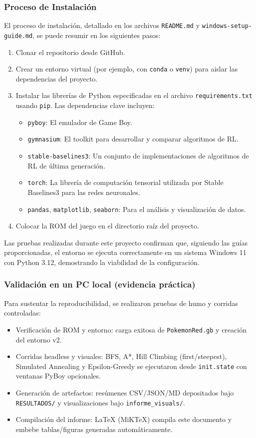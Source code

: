\documentclass[12pt, oneside, openany]{book}
\begin{document}
\subsubsection{Proceso de Instalación}
El proceso de instalación, detallado en los archivos \texttt{README.md} y \texttt{windows-setup-guide.md}, se puede resumir en los siguientes pasos:
\begin{enumerate}
    \item Clonar el repositorio desde GitHub.
    \item Crear un entorno virtual (por ejemplo, con \texttt{conda} o \texttt{venv}) para aislar las dependencias del proyecto.
    \item Instalar las librerías de Python especificadas en el archivo \texttt{requirements.txt} usando \texttt{pip}. Las dependencias clave incluyen:
    \begin{itemize}
        \item \texttt{pyboy}: El emulador de Game Boy.
        \item \texttt{gymnasium}: El toolkit para desarrollar y comparar algoritmos de RL.
        \item \texttt{stable-baselines3}: Un conjunto de implementaciones de algoritmos de RL de última generación.
        \item \texttt{torch}: La librería de computación tensorial utilizada por Stable Baselines3 para las redes neuronales.
        \item \texttt{pandas}, \texttt{matplotlib}, \texttt{seaborn}: Para el análisis y visualización de datos.
    \end{itemize}
    \item Colocar la ROM del juego en el directorio raíz del proyecto.
\end{enumerate}
Las pruebas realizadas durante este proyecto confirman que, siguiendo las guías proporcionadas, el entorno se ejecuta correctamente en un sistema Windows 11 con Python 3.12, demostrando la viabilidad de la configuración.

\subsubsection{Validación en un PC local (evidencia práctica)}
Para sustentar la reproducibilidad, se realizaron pruebas de humo y corridas controladas:
\begin{itemize}
    \item Verificación de ROM y entorno: carga exitosa de \texttt{PokemonRed.gb} y creación del entorno v2.
    \item Corridas headless y visuales: BFS, A*, Hill Climbing (first/steepest), Simulated Annealing y Epsilon-Greedy se ejecutaron desde \texttt{init.state} con ventanas PyBoy opcionales.
    \item Generación de artefactos: resúmenes CSV/JSON/MD depositados bajo \texttt{RESULTADOS/} y visualizaciones bajo \texttt{informe\_visuals/}.
    \item Compilación del informe: \LaTeX{} (MiKTeX) compila este documento y embebe tablas/figuras generadas automáticamente.
\end{itemize}
\end{document}

